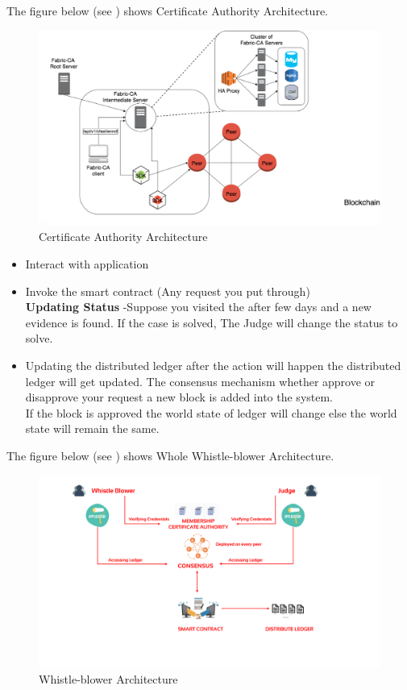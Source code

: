 The figure below (see ) shows Certificate Authority Architecture.\\ 
\begin{figure}[h]
	\centering
	\includegraphics[scale=0.90]{figures/07.png}
	\caption{Certificate Authority Architecture }
	\label{fig:istb}
\end{figure}  
\begin{itemize}
	\item	Interact with application
	\item 	Invoke the smart contract (Any request you put through)\\
	\textbf{      Updating Status }-Suppose you visited the after few days and a new evidence is found. If the case is solved, The Judge will change the status to solve. 
	\item 		Updating the distributed ledger 
		after the action will happen the distributed ledger will get updated. The consensus mechanism whether approve or disapprove your request a new block is added into the system.\\ 
		If the block is approved the world state of ledger will change else the world state will remain the same. 
	
\end{itemize}
The figure below (see ) shows Whole Whistle-blower Architecture.\\ 
\begin{figure}[h]
	\centering
	\includegraphics[scale=0.40]{figures/08.png}
	\caption{Whistle-blower Architecture }
	\label{fig:istz}
\end{figure}  
